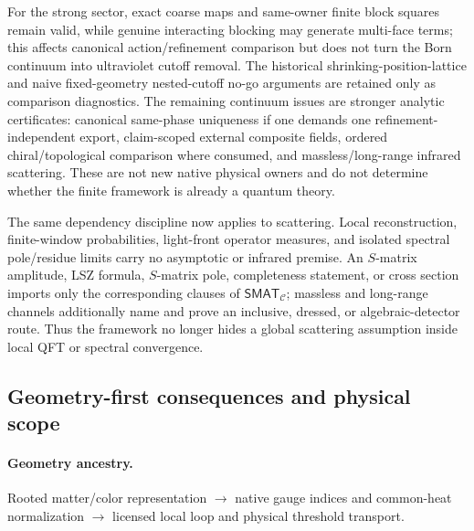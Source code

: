 \documentclass[12pt,a4paper]{article}
\begin{document}
For the strong sector, exact coarse maps and same-owner finite block squares remain valid, while genuine interacting blocking may generate multi-face terms; this affects canonical action/refinement comparison but does not turn the Born continuum into ultraviolet cutoff removal.  The historical shrinking-position-lattice and naive fixed-geometry nested-cutoff no-go arguments are retained only as comparison diagnostics.  The remaining continuum issues are stronger analytic certificates: canonical same-phase uniqueness if one demands one refinement-independent export, claim-scoped external composite fields, ordered chiral/topological comparison where consumed, and massless/long-range infrared scattering.  These are not new native physical owners and do not determine whether the finite framework is already a quantum theory.

The same dependency discipline now applies to scattering.  Local reconstruction,
finite-window probabilities, light-front operator measures, and isolated
spectral pole/residue limits carry no asymptotic or infrared premise.  An
\(S\)-matrix amplitude, LSZ formula, \(S\)-matrix pole, completeness statement,
or cross section imports only the corresponding clauses of
\(\mathsf{SMAT}_{\mathcal C}\); massless and long-range channels additionally
name and prove an inclusive, dressed, or algebraic-detector route.  Thus the
framework no longer hides a global scattering assumption inside local QFT or
spectral convergence.




\subsection{Geometry-first consequences and physical scope}
\label{p12:sec:v2201-geometry-first-consequences}
\paragraph{Geometry ancestry.}
Rooted matter/color representation $\to$ native gauge indices and common-heat normalization $\to$ licensed local loop and physical threshold transport.
\end{document}
